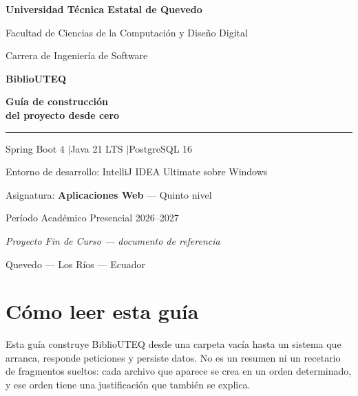 \documentclass[11pt,a4paper,openany]{book}
\begin{document}
\frontmatter

\begin{titlepage}
	\centering
	\vspace*{1.2cm}
	{\LARGE\bfseries\color{uteqverde} Universidad Técnica Estatal de Quevedo\par}
	\vspace{0.4cm}
	{\large Facultad de Ciencias de la Computación y Diseño Digital\par}
	{\large Carrera de Ingeniería de Software\par}
	\vspace{2.0cm}
	{\Huge\bfseries\color{uteqverde} BiblioUTEQ\par}
	\vspace{0.5cm}
	{\Huge\bfseries Guía de construcción\\[0.3cm] del proyecto desde cero\par}
	\vspace{1.0cm}
	\rule{0.75\textwidth}{1.5pt}\par
	\vspace{0.8cm}
	{\Large Spring Boot 4 \quad$\vert$\quad Java 21 LTS \quad$\vert$\quad PostgreSQL 16\par}
	\vspace{0.3cm}
	{\large Entorno de desarrollo: IntelliJ IDEA Ultimate sobre Windows\par}
	\vspace{2.0cm}
	{\large Asignatura: \textbf{Aplicaciones Web} --- Quinto nivel\par}
	{\large Período Académico Presencial 2026--2027\par}
	\vspace{1.5cm}
	{\large\itshape Proyecto Fin de Curso --- documento de referencia\par}
	\vfill
	{\large Quevedo --- Los Ríos --- Ecuador\par}
\end{titlepage}

\chapter*{Cómo leer esta guía}

Esta guía construye BiblioUTEQ desde una carpeta vacía hasta un sistema que arranca, responde peticiones y persiste datos. No es un resumen ni un recetario de fragmentos sueltos: cada archivo que aparece se crea en un orden determinado, y ese orden tiene una justificación que también se explica.
\end{document}
